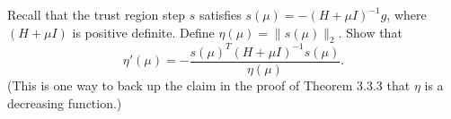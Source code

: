 \documentclass[11pt]{article}
\begin{document}
Recall that the trust region step $s$ satisfies $s(\mu)=-(H+\mu I)^{-1}g$, where $(H+\mu I)$ is positive definite. Define $\eta(\mu)=\|s(\mu)\|_2$. Show that
\[
  \eta'(\mu) = -\frac{s(\mu)^T(H+\mu I)^{-1}s(\mu)}{\eta(\mu)}.
\]
(This is one way to back up the claim in the proof of Theorem 3.3.3 that $\eta$ is a decreasing function.) 
\end{document}
